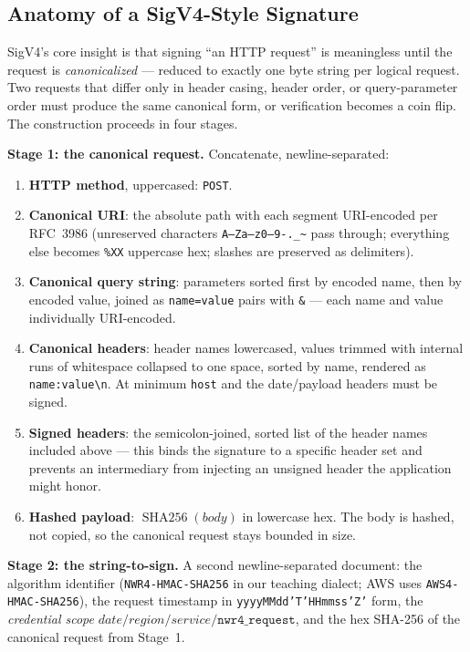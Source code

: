\subsection{Anatomy of a SigV4-Style Signature}
\label{sec:ch5-sigv4}

SigV4's core insight is that signing ``an HTTP request'' is meaningless until
the request is \emph{canonicalized} --- reduced to exactly one byte string
per logical request. Two requests that differ only in header casing, header
order, or query-parameter order must produce the same canonical form, or
verification becomes a coin flip. The construction proceeds in four stages.

\textbf{Stage 1: the canonical request.} Concatenate, newline-separated:

\begin{enumerate}
  \item \textbf{HTTP method}, uppercased: \texttt{POST}.
  \item \textbf{Canonical URI}: the absolute path with each segment
        URI-encoded per RFC~3986 (unreserved characters
        \texttt{A--Za--z0--9-.\_\textasciitilde{}} pass through; everything
        else becomes \texttt{\%XX} uppercase hex; slashes are preserved as
        delimiters).
  \item \textbf{Canonical query string}: parameters sorted first by encoded
        name, then by encoded value, joined as \texttt{name=value} pairs
        with \texttt{\&} --- each name and value individually URI-encoded.
  \item \textbf{Canonical headers}: header names lowercased, values trimmed
        with internal runs of whitespace collapsed to one space, sorted by
        name, rendered as \texttt{name:value\textbackslash{}n}. At minimum
        \texttt{host} and the date/payload headers must be signed.
  \item \textbf{Signed headers}: the semicolon-joined, sorted list of the
        header names included above --- this binds the signature to a
        specific header set and prevents an intermediary from injecting an
        unsigned header the application might honor.
  \item \textbf{Hashed payload}: $\operatorname{SHA256}(\textit{body})$ in
        lowercase hex. The body is hashed, not copied, so the canonical
        request stays bounded in size.
\end{enumerate}

\textbf{Stage 2: the string-to-sign.} A second newline-separated document:
the algorithm identifier (\texttt{NWR4-HMAC-SHA256} in our teaching
dialect; AWS uses \texttt{AWS4-HMAC-SHA256}), the request timestamp in
\texttt{yyyyMMdd'T'HHmmss'Z'} form, the \emph{credential scope}
$\textit{date}/\textit{region}/\textit{service}/\texttt{nwr4\_request}$,
and the hex SHA-256 of the canonical request from Stage~1.

